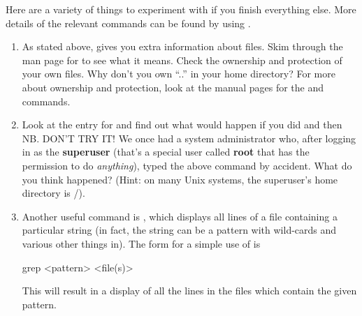 Here are a variety of things to experiment with if you finish
everything else. More details of the relevant commands can be found
by using .
%
\begin{enumerate}
%
%
\item As stated above,  gives you extra information
 about files. Skim through the man page for  to see what
 it means. Check the ownership and protection of your
 own files. Why don't you own ``..''  in your home directory? For more
 about ownership and protection, look at the manual pages for the
  and  commands.
%
\item Look at the  entry for   and find out
  what would happen if you did  and then  
  \\ 
  NB. DON'T TRY IT!  We once had a system administrator who, after
  logging in as the \textbf{superuser} (that's a special user called
  \textbf{root} that has the permission to do \emph{anything}), typed
  the above command by accident. What do you think happened? (Hint: on
  many Unix systems, the superuser's home directory is /).
\item Another useful command is , which displays all
  lines of a file containing a particular string (in fact, the
  string can be a pattern with wild-cards and various other things in).
  The form for a simple use of  is
\begin{ttoutenv}
  grep <pattern> <file(s)>
\end{ttoutenv}
%
This will result in a display of all the lines in the files which
contain the given pattern.


\end{enumerate}
